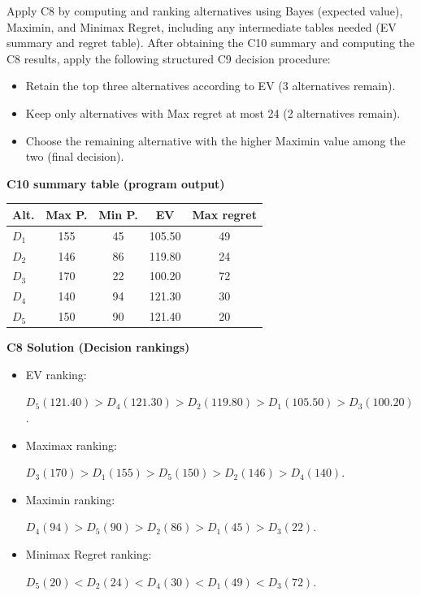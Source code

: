 \begin{ExamProblems}
		Apply C8 by computing and ranking alternatives using Bayes (expected value), Maximin, and Minimax Regret, including any intermediate tables needed (EV summary and regret table).
		After obtaining the C10 summary and computing the C8 results, apply the following structured C9 decision procedure:
		\begin{itemize}
			\item Retain the top three alternatives according to EV (3 alternatives remain).
			\item Keep only alternatives with Max regret at most 24 (2 alternatives remain).
			\item Choose the remaining alternative with the higher Maximin value among the two (final decision).
		\end{itemize}
		
		\vspace{0.25cm}
		
		\textbf{C10 summary table (program output)}\par
		\begin{center}
			\begin{tabular}{l c c c c}
				\hline
				Alt. & Max P. & Min P. & EV & Max regret \\
				\hline
				$D_1$ & 155 & 45 & 105.50 & 49 \\
				$D_2$ & 146 & 86 & 119.80 & 24 \\
				$D_3$ & 170 & 22 & 100.20 & 72 \\
				$D_4$ & 140 & 94 & 121.30 & 30 \\
				$D_5$ & 150 & 90 & 121.40 & 20 \\
				\hline
			\end{tabular}
		\end{center}
		
		\textbf{C8 Solution (Decision rankings)}\par
		\begin{itemize}
			\item EV ranking: \par $D_5(121.40)>D_4(121.30)>D_2(119.80)>D_1(105.50)>D_3(100.20)$.
			\item Maximax ranking:\par $D_3(170)>D_1(155)>D_5(150)>D_2(146)>D_4(140)$.
			\item Maximin ranking: \par $D_4(94)>D_5(90)>D_2(86)>D_1(45)>D_3(22)$.
			\item Minimax Regret ranking:\par $D_5(20)<D_2(24)<D_4(30)<D_1(49)<D_3(72)$.
		\end{itemize}
		

\end{ExamProblems}
